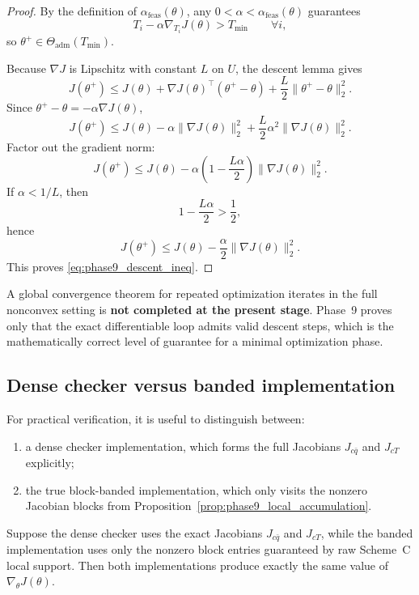 \begin{proof}
By the definition of \(\alpha_{\mathrm{feas}}(\theta)\), any \(0<\alpha<\alpha_{\mathrm{feas}}(\theta)\) guarantees
\[
T_i-\alpha \nabla_{T_i}J(\theta)>T_{\min}
\qquad
\forall i,
\]
so \(\theta^+\in \Theta_{\mathrm{adm}}(T_{\min})\).

Because \(\nabla J\) is Lipschitz with constant \(L\) on \(U\), the descent lemma gives
\[
J(\theta^+)
\le
J(\theta)
+
\nabla J(\theta)^\top(\theta^+-\theta)
+
\frac{L}{2}\|\theta^+-\theta\|_2^2.
\]
Since \(\theta^+-\theta=-\alpha \nabla J(\theta)\),
\[
J(\theta^+)
\le
J(\theta)
-
\alpha \|\nabla J(\theta)\|_2^2
+
\frac{L}{2}\alpha^2 \|\nabla J(\theta)\|_2^2.
\]
Factor out the gradient norm:
\[
J(\theta^+)
\le
J(\theta)
-
\alpha\left(1-\frac{L\alpha}{2}\right)\|\nabla J(\theta)\|_2^2.
\]
If \(\alpha<1/L\), then
\[
1-\frac{L\alpha}{2}>\frac12,
\]
hence
\[
J(\theta^+)
\le
J(\theta)
-
\frac{\alpha}{2}\|\nabla J(\theta)\|_2^2.
\]
This proves \eqref{eq:phase9_descent_ineq}.
\end{proof}

\begin{remark}
\label{rem:phase9_global_opt_limitation}
A global convergence theorem for repeated optimization iterates in the full nonconvex setting is \textbf{not completed at the present stage}.
Phase~9 proves only that the exact differentiable loop admits valid descent steps, which is the mathematically correct level of guarantee for a minimal optimization phase.
\end{remark}

\subsection{Dense checker versus banded implementation}
\label{subsec:phase9_dense_checker}

For practical verification, it is useful to distinguish between:
\begin{enumerate}
    \item a dense checker implementation, which forms the full Jacobians \(J_{c\bar q}\) and \(J_{cT}\) explicitly;
    \item the true block-banded implementation, which only visits the nonzero Jacobian blocks from Proposition~\ref{prop:phase9_local_accumulation}.
\end{enumerate}

\begin{proposition}
\label{prop:phase9_dense_checker}
Suppose the dense checker uses the exact Jacobians \(J_{c\bar q}\) and \(J_{cT}\), while the banded implementation uses only the nonzero block entries guaranteed by raw Scheme~C local support.
Then both implementations produce exactly the same value of \(\nabla_\theta J(\theta)\).
\end{proposition}

